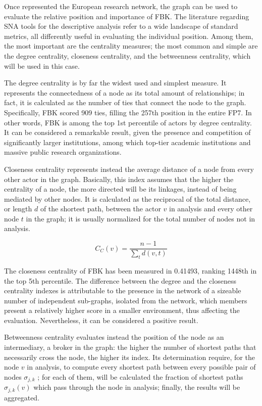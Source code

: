 Once represented the European research network, the graph can be used to evaluate the relative position and importance of FBK. The literature regarding SNA tools for the descriptive analysis refer to a wide landscape of standard metrics, all differently useful in evaluating the individual position. Among them, the most important are the centrality measures; the most common and simple are the degree centrality, closeness centrality, and the betweenness centrality, which will be used in this case.

The degree centrality is by far the widest used and simplest measure. It represents the connectedness of a node as its total amount of relationships; in fact, it is calculated as the number of ties that connect the node to the graph. Specifically, FBK scored 909 ties, filling the 257th position in the entire FP7. In other words, FBK is among the top 1st percentile of actors by degree centrality. It can be considered a remarkable result, given the presence and competition of significantly larger institutions, among which top-tier academic institutions and massive public research organizations. 

Closeness centrality represents instead the average distance of a node from every other actor in the graph. Basically, this index assumes that the higher the centrality of a node, the more directed will be its linkages, instead of being mediated by other nodes. It is calculated as the reciprocal of the total distance, or length $d$ of the shortest path, between the actor $v$ in analysis and every other node $t$ in the graph; it is usually normalized for the total number of nodes not in analysis. 

\[
	C_C (v) =
		\frac 
			{n-1}
			{
				\sum_t d(v, t)
			} 
\]

The closeness centrality of FBK has been measured in 0.41493, ranking 1448th in the top 5th percentile. The difference between the degree and the closeness centrality indexes is attributable to the presence in the network of a sizeable number of independent sub-graphs, isolated from the network, which members present a relatively higher score in a smaller environment, thus affecting the evaluation. Nevertheless, it can be considered a positive result.  

Betweenness centrality evaluates instead the position of the node as an intermediary, a broker in the graph: the higher the number of shortest paths that necessarily cross the node, the higher its index. Its determination require, for the node $v$ in analysis, to compute every shortest path between every possible pair of nodes $\sigma_{j,k}$ ; for each of them, will be calculated the fraction of shortest paths $\sigma_{j,k} (v)$ which pass through the node in analysis; finally, the results will be aggregated. 


